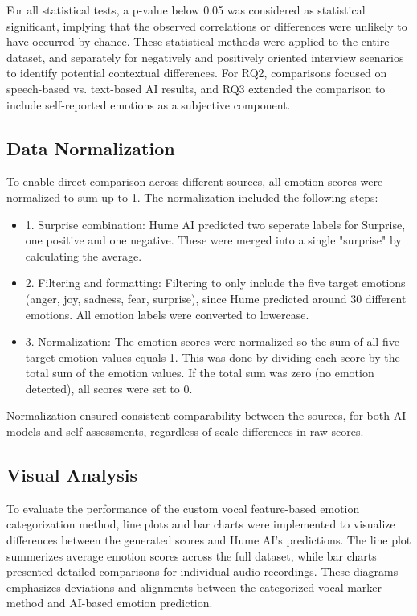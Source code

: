 For all statistical tests, a p-value below 0.05 was considered as statistical significant, implying that the observed correlations or differences were unlikely to have occurred by chance. 
These statistical methods were applied to the entire dataset, and separately for negatively and positively oriented interview scenarios to identify potential contextual differences.
For RQ2, comparisons focused on speech-based vs. text-based AI results, and RQ3 extended the comparison to include self-reported emotions as a subjective component.

\subsection{Data Normalization}
To enable direct comparison across different sources, all emotion scores were normalized to sum up to 1. The normalization included the following steps: 
\begin{itemize}
    \item 1. Surprise combination: Hume AI predicted two seperate labels for Surprise, one positive and one negative. These were merged into a single "surprise" by calculating the average. 
    \item 2. Filtering and formatting: Filtering to only include the five target emotions (anger, joy, sadness, fear, surprise), since Hume predicted around 30 different emotions. All emotion labels were converted to lowercase. 
    \item 3. Normalization: The emotion scores were normalized so the sum of all five target emotion values equals 1. This was done by dividing each score by the total sum of the emotion values. If the total sum was zero (no emotion detected), all scores were set to 0. 
\end{itemize}
Normalization ensured consistent comparability between the sources, for both AI models and self-assessments, regardless of scale differences in raw scores. 
\subsection{Visual Analysis}

To evaluate the performance of the custom vocal feature-based emotion categorization method, line plots and bar charts were implemented to visualize differences between the generated scores and Hume AI's predictions. 
The line plot summerizes average emotion scores across the full dataset, while bar charts presented detailed comparisons for individual audio recordings. 
These diagrams emphasizes deviations and alignments between the categorized vocal marker method and AI-based emotion prediction. 

